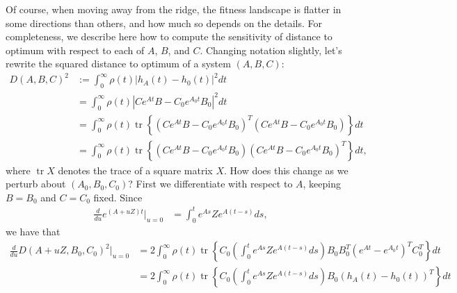 \documentclass{article}
\newcommand{\tr}{\mathop{\mbox{tr}}} %
\newcommand{\1}{\mathbbm{1}}
\begin{document}
Of course, when moving away from the ridge, the fitness landscape is flatter in some directions than others,
and how much so depends on the details.
For completeness, we describe here how to compute the sensitivity of distance to optimum
with respect to each of $A$, $B$, and $C$.
Changing notation slightly, let's rewrite the squared distance to optimum
of a system $(A, B, C)$:
\begin{equation}
    \begin{aligned}
        D(A, B, C)^2
        &:= 
        \int_0^\infty \rho(t) \left| h_A(t) - h_0(t) \right|^2 dt \\
        &= 
        \int_0^\infty \rho(t) \left| C e^{At} B - C_0 e^{A_0 t} B_0 \right|^2 dt \\
        &= 
        \int_0^\infty \rho(t) \tr\left\{
            \left( C e^{At} B - C_0 e^{A_0 t} B_0 \right)^T
            \left( C e^{At} B - C_0 e^{A_0 t} B_0 \right)
        \right\} dt \\
        &= 
        \int_0^\infty \rho(t) \tr\left\{
            \left( C e^{At} B - C_0 e^{A_0 t} B_0 \right)
            \left( C e^{At} B - C_0 e^{A_0 t} B_0 \right)^T
        \right\} dt  ,
    \end{aligned}
\end{equation}
where $\tr X$ denotes the trace of a square matrix $X$.
How does this change as we perturb about $(A_0, B_0, C_0)$?
First we differentiate with respect to $A$, keeping $B=B_0$ and $C=C_0$ fixed.
Since
\begin{equation}
  \begin{aligned}
      \frac{d}{du} e^{(A+uZ)t} \vert_{u=0}
      &=
      \int_0^t e^{As} Z e^{A(t-s)} ds, 
  \end{aligned}
\end{equation}
we have that
\begin{equation}
  \begin{aligned}
      \frac{d}{du} D(A+uZ,B_0,C_0)^2 \vert_{u=0}
      &=
        2 \int_0^\infty \rho(t) \tr\left\{ C_0 \left( \int_0^t e^{As} Z e^{A(t-s)} ds \right) B_0 B_0^T \left( e^{At} - e^{A_0 t} \right)^T C_0^T \right\} dt \\
      &=
        2 \int_0^\infty \rho(t) \tr\left\{ C_0 \left( \int_0^t e^{As} Z e^{A(t-s)} ds \right) B_0 \left( h_A(t) - h_0(t) \right)^T \right\} dt 
  \end{aligned}
\end{equation}
\end{document}
